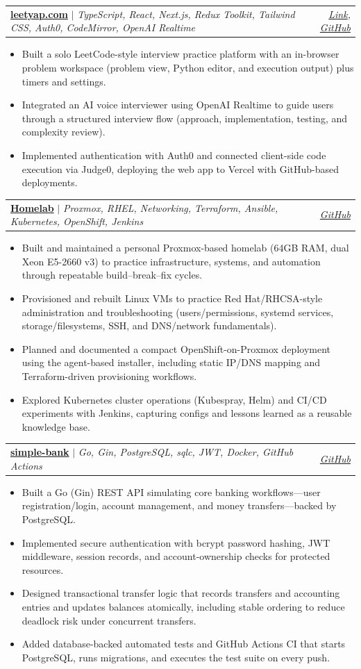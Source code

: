 \documentclass[letterpaper,11pt]{article}
\makeatletter
\newcommand{\resumeItem}[1]{
  \item\small{
    {#1 \vspace{-2pt}}
  }
}
\newcommand{\resumeProjectHeading}[2]{
    \item
    \begin{tabular*}{0.97\textwidth}{l@{\extracolsep{\fill}}r}
      \small#1 & #2 \\
    \end{tabular*}\vspace{-7pt}
}
\newcommand{\resumeItemListStart}{\begin{itemize}}
\newcommand{\resumeItemListEnd}{\end{itemize}\vspace{-5pt}}
\makeatother
\begin{document}
        \resumeProjectHeading
        {\textbf{\href{https://www.leetyap.com/}{leetyap.com}} $|$ \emph{TypeScript, React, Next.js, Redux Toolkit, Tailwind CSS, Auth0, CodeMirror, OpenAI Realtime}}{\emph{\href{https://leetyap.com}{Link}, \href{https://GitHub.com/matoanbach/leetyap}{GitHub}}}
        \resumeItemListStart
          \resumeItem{Built a solo LeetCode-style interview practice platform with an in-browser problem workspace (problem view, Python editor, and execution output) plus timers and settings.}
          \resumeItem{Integrated an AI voice interviewer using OpenAI Realtime to guide users through a structured interview flow (approach, implementation, testing, and complexity review).}
          \resumeItem{Implemented authentication with Auth0 and connected client-side code execution via Judge0, deploying the web app to Vercel with GitHub-based deployments.}
        \resumeItemListEnd

        \resumeProjectHeading
        {\textbf{\href{https://GitHub.com/matoanbach/homelab}{Homelab}} $|$ \emph{Proxmox, RHEL, Networking, Terraform, Ansible, Kubernetes, OpenShift, Jenkins}}{\emph{\href{https://GitHub.com/matoanbach/homelab}{GitHub}}}
        \resumeItemListStart
          \resumeItem{Built and maintained a personal Proxmox-based homelab (64GB RAM, dual Xeon E5-2660 v3) to practice infrastructure, systems, and automation through repeatable build–break–fix cycles.}
          \resumeItem{Provisioned and rebuilt Linux VMs to practice Red Hat/RHCSA-style administration and troubleshooting (users/permissions, systemd services, storage/filesystems, SSH, and DNS/network fundamentals).}
          \resumeItem{Planned and documented a compact OpenShift-on-Proxmox deployment using the agent-based installer, including static IP/DNS mapping and Terraform-driven provisioning workflows.}
          \resumeItem{Explored Kubernetes cluster operations (Kubespray, Helm) and CI/CD experiments with Jenkins, capturing configs and lessons learned as a reusable knowledge base.}
        \resumeItemListEnd
                    
        \resumeProjectHeading
        {\textbf{\href{https://GitHub.com/matoanbach/simple-bank}{simple-bank}} $|$ \emph{Go, Gin, PostgreSQL, sqlc, JWT, Docker, GitHub Actions}}{\emph{\href{https://GitHub.com/matoanbach/simple-bank}{GitHub}}}
        \resumeItemListStart
          \resumeItem{Built a Go (Gin) REST API simulating core banking workflows—user registration/login, account management, and money transfers—backed by PostgreSQL.}
          \resumeItem{Implemented secure authentication with bcrypt password hashing, JWT middleware, session records, and account-ownership checks for protected resources.}
          \resumeItem{Designed transactional transfer logic that records transfers and accounting entries and updates balances atomically, including stable ordering to reduce deadlock risk under concurrent transfers.}
          \resumeItem{Added database-backed automated tests and GitHub Actions CI that starts PostgreSQL, runs migrations, and executes the test suite on every push.}
        \resumeItemListEnd
\end{document}

